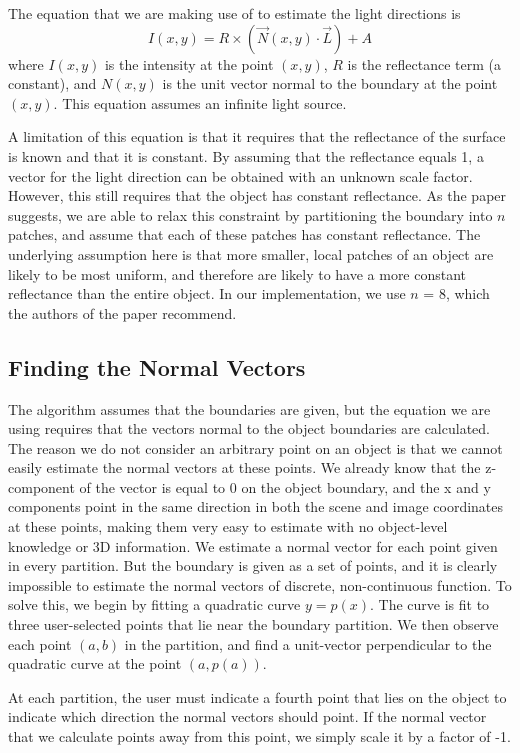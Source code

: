 \documentclass[10pt,twocolumn,letterpaper]{article}
\begin{document}
The equation that we are making use of to estimate the light directions is \[I(x,y) = R\times (\vec{N}(x,y)\cdot \vec{L}) + A\]
where $I(x,y)$ is the intensity at the point $(x,y)$, $R$ is the reflectance term (a constant), and $N(x,y)$ is the unit vector normal to the boundary at the point $(x,y)$. This equation assumes an infinite light source.

A limitation of this equation is that it requires that the reflectance of the surface is known and that it is constant. By assuming that the reflectance equals 1, a vector for the light direction can be obtained with an unknown scale factor. However, this still requires that the object has constant reflectance. As the paper suggests, we are able to relax this constraint by partitioning the boundary into $n$ patches, and assume that each of these patches has constant reflectance. The underlying assumption here is that more smaller, local patches of an object are likely to be most uniform, and therefore are likely to have a more constant reflectance than the entire object. In our implementation, we use $n$ = 8, which the authors of the paper recommend.

\subsection{Finding the Normal Vectors}
The algorithm assumes that the boundaries are given, but the equation we are using requires that the vectors normal to the object boundaries are calculated. The reason we do not consider an arbitrary point on an object is that we cannot easily estimate the normal vectors at these points. We already know that the z-component of the vector is equal to 0 on the object boundary, and the x and y components point in the same direction in both the scene and image coordinates at these points, making them very easy to estimate with no object-level knowledge or 3D information. We estimate a normal vector for each point given in every partition. But the boundary is given as a set of points, and it is clearly impossible to estimate the normal vectors of discrete, non-continuous function. To solve this, we begin by fitting a quadratic curve $y = p(x)$. The curve is fit to three user-selected points that lie near the boundary partition. We then observe each point $(a,b)$ in the partition, and find a unit-vector perpendicular to the quadratic curve at the point $(a,p(a))$. 

At each partition, the user must indicate a fourth point that lies on the object to indicate which direction the normal vectors should point. If the normal vector that we calculate points away from this point, we simply scale it by a factor of -1.
\end{document}
